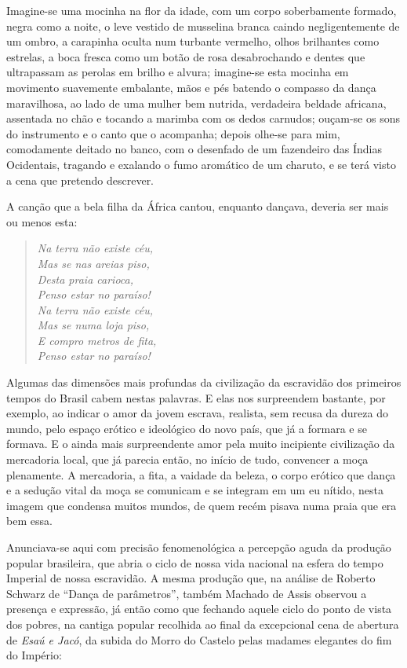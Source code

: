 Imagine-se uma mocinha na flor da idade, com um corpo soberbamente
formado, negra como a noite, o leve vestido de musselina branca caindo
negligentemente de um ombro, a carapinha oculta num turbante vermelho,
olhos brilhantes como estrelas, a boca fresca como um botão de rosa
desabrochando e dentes que ultrapassam as perolas em brilho e alvura;
imagine-se esta mocinha em movimento suavemente embalante, mãos e pés
batendo o compasso da dança maravilhosa, ao lado de uma mulher bem
nutrida, verdadeira beldade africana, assentada no chão e tocando a
marimba com os dedos carnudos; ouçam-se os sons do instrumento e o canto
que o acompanha; depois olhe-se para mim, comodamente deitado no banco,
com o desenfado de um fazendeiro das Índias Ocidentais, tragando e
exalando o fumo aromático de um charuto, e se terá visto a cena que
pretendo descrever.

A canção que a bela filha da África cantou, enquanto dançava, deveria
ser mais ou menos esta:

\begin{verse}
\emph{Na terra não existe céu,\\
Mas se nas areias piso,\\
Desta praia carioca,\\
Penso estar no paraíso!\\[5pt]
Na terra não existe céu,\\
Mas se numa loja piso,\\
E compro metros de fita,\\
Penso estar no paraíso!}
\end{verse}

Algumas das dimensões mais profundas da civilização da escravidão dos
primeiros tempos do Brasil cabem nestas palavras. E elas nos surpreendem
bastante, por exemplo, ao indicar o amor da jovem escrava, realista, sem
recusa da dureza do mundo, pelo espaço erótico e ideológico do novo
país, que já a formara e se formava. E o ainda mais surpreendente amor
pela muito incipiente civilização da mercadoria local, que já parecia
então, no início de tudo, convencer a moça plenamente. A mercadoria, a
fita, a vaidade da beleza, o corpo erótico que dança e a sedução vital
da moça se comunicam e se integram em um eu nítido, nesta imagem que
condensa muitos mundos, de quem recém pisava numa praia que era bem
essa.

Anunciava-se aqui com precisão fenomenológica a percepção aguda da
produção popular brasileira, que abria o ciclo de nossa vida nacional na
esfera do tempo Imperial de nossa escravidão. A mesma produção que, na
análise de Roberto Schwarz de ``Dança de parâmetros'', também Machado de
Assis observou a presença e expressão, já então como que fechando aquele
ciclo do ponto de vista dos pobres, na cantiga popular recolhida ao
final da excepcional cena de abertura de \emph{Esaú e Jacó}, da subida
do Morro do Castelo pelas madames elegantes do fim do Império:

